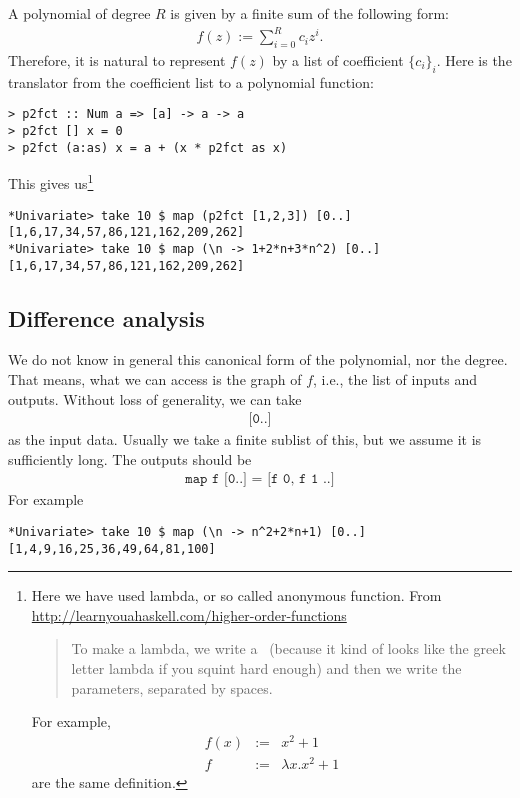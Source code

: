 \documentclass[11pt]{book}
\begin{document}
A polynomial of degree $R$ is given by a finite sum of the following form:
\begin{eqnarray}
f(z) := \sum_{i=0}^R c_i z^i.
\end{eqnarray}
Therefore, it is natural to represent $f(z)$ by a list of coefficient $\{c_i\}_i$.
Here is the translator from the coefficient list to a polynomial function:
\begin{verbatim}
> p2fct :: Num a => [a] -> a -> a
> p2fct [] x = 0
> p2fct (a:as) x = a + (x * p2fct as x)
\end{verbatim}
This gives us\footnote{
Here we have used lambda, or so called anonymous function.
From \url{http://learnyouahaskell.com/higher-order-functions}
\begin{quote}
To make a lambda, we write a \ (because it kind of looks like the greek letter lambda if you squint hard enough) and then we write the parameters, separated by spaces. 
\end{quote}
For example,
\begin{eqnarray}
f(x) &:=& x^2 + 1 \\
f &:=& \lambda x. x^2+1
\end{eqnarray}
are the same definition.
}
\begin{verbatim}
*Univariate> take 10 $ map (p2fct [1,2,3]) [0..]
[1,6,17,34,57,86,121,162,209,262]
*Univariate> take 10 $ map (\n -> 1+2*n+3*n^2) [0..]
[1,6,17,34,57,86,121,162,209,262]
\end{verbatim}

\subsection{Difference analysis}
We do not know in general this canonical form of the polynomial, nor the degree.
That means, what we can access is the graph of $f$, i.e., the list of inputs and outputs.
Without loss of generality, we can take
\begin{eqnarray}
\texttt{[0..]}
\end{eqnarray}
as the input data.
Usually we take a finite sublist of this, but we assume it is sufficiently long.
The outputs should be
\begin{eqnarray}
\texttt{map f [0..] = [f 0, f 1 ..]}
\end{eqnarray}
For example
\begin{verbatim}
*Univariate> take 10 $ map (\n -> n^2+2*n+1) [0..]
[1,4,9,16,25,36,49,64,81,100]
\end{verbatim}
\end{document}
